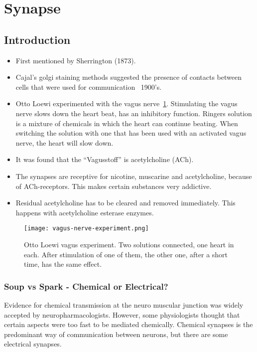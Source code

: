 \documentclass[main]{subfiles}
\begin{document}

\section{Synapse}
\subsection{Introduction}
\begin{itemize}[noitemsep,nolistsep]
	\item First mentioned by Sherrington (1873).
	\item Cajal's golgi staining methods suggested the presence of contacts between cells that were used for communication ~1900's.
	\item Otto Loewi experimented with the vagus nerve~\ref{fig:vagus-experiment}.
	\subitem Stimulating the vagus nerve slows down the heart beat, has an inhibitory function.
	\subitem Ringers solution is a mixture of chemicals in which the heart can continue beating.
	\subitem When switching the solution with one that has been used with an activated vagus nerve, the heart will slow down.
	\item It was found that the ``Vagusstoff'' is acetylcholine (ACh).
	\item The synapses are receptive for nicotine, muscarine and acetylcholine, because of ACh-receptors. This makes certain substances very addictive.
	\item Residual acetylcholine has to be cleared and removed immediately. This happens with acetylcholine esterase enzymes.
\end{itemize}

\begin{figure}[H]
	\centering
 	\texttt{[image: vagus-nerve-experiment.png]}
 	\caption{Otto Loewi vagus experiment. Two solutions connected, one heart in each. After stimulation of one of them, the other one, after a short time, has the same effect.}
 	\label{fig:vagus-experiment}
\end{figure} 

\subsubsection{Soup vs Spark - Chemical or Electrical?}
Evidence for chemical transmission at the neuro muscular junction was widely accepted by neuropharmacologists. However, some physiologists thought that certain aspects were too fast to be mediated chemically.
Chemical synapses is the predominant way of communication between neurons, but there are some electrical synapses.
\end{document}
